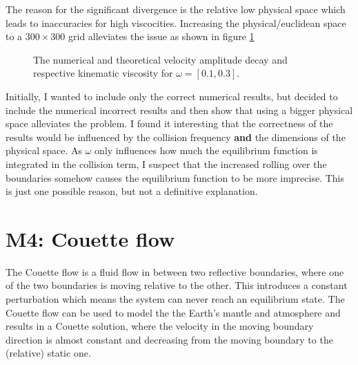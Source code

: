 \documentclass[a4paper,12pt, oneside]{book}
\begin{document}
The reason for the significant divergence is the relative low physical space which leads to inaccuracies for high viscocities. Increasing the physical/euclidean space to a $300\times300$ grid alleviates the issue as shown in figure \ref{fig:m3-3-update}
\begin{figure}[ht]
\centering
\resizebox{0.8\columnwidth}{!}{\large}
\caption[Kinematic viscosity]{The numerical and theoretical velocity amplitude decay and respective kinematic viscosity for $\omega=[0.1, 0.3] $.}
\label{fig:m3-3-update}
\end{figure}
Initially, I wanted to include only the correct numerical results, but decided to include the numerical incorrect results and then show that using a bigger physical space alleviates the problem.
I found it interesting that the correctness of the results would be influenced by the collision frequency \textbf{and} the dimensions of the physical space. 
As $\omega$ only influences how much the equilibrium function is integrated in the collision term, I suspect that the increased rolling over the boundaries somehow causes the equilibrium function to be more imprecise. 
This is just one possible reason, but not a definitive explanation.

\section{M4: Couette flow}
The Couette flow is a fluid flow in between two reflective boundaries, where one of the two boundaries is moving relative to the other. 
This introduces a constant perturbation which means the system can never reach an equilibrium state.
The Couette flow can be used to model the the Earth's mantle and atmosphere and results in a Couette solution, where the velocity in the moving boundary direction is almost constant and decreasing from the moving boundary to the (relative) static one.
\end{document}

